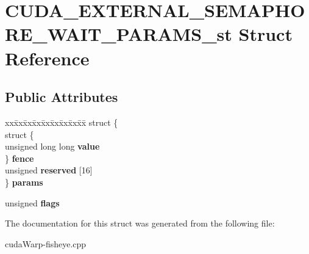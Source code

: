 \hypertarget{structCUDA__EXTERNAL__SEMAPHORE__WAIT__PARAMS__st}{}\section{C\+U\+D\+A\+\_\+\+E\+X\+T\+E\+R\+N\+A\+L\+\_\+\+S\+E\+M\+A\+P\+H\+O\+R\+E\+\_\+\+W\+A\+I\+T\+\_\+\+P\+A\+R\+A\+M\+S\+\_\+st Struct Reference}
\label{structCUDA__EXTERNAL__SEMAPHORE__WAIT__PARAMS__st}
\subsection*{Public Attributes}
\begin{DoxyCompactItemize}
\item 
\begin{tabbing}
xx\=xx\=xx\=xx\=xx\=xx\=xx\=xx\=xx\=\kill
struct \{\\
\>struct \{\\
\>\>unsigned long long {\bfseries value}\\
\>\} {\bfseries fence}\\
\>unsigned {\bfseries reserved} \mbox{[}16\mbox{]}\\
\} {\bfseries params}\hypertarget{structCUDA__EXTERNAL__SEMAPHORE__WAIT__PARAMS__st_abf6d63547737e7929ed2e1e17262b6fe}{}\label{structCUDA__EXTERNAL__SEMAPHORE__WAIT__PARAMS__st_abf6d63547737e7929ed2e1e17262b6fe}
\\

\end{tabbing}\item 
unsigned {\bfseries flags}\hypertarget{structCUDA__EXTERNAL__SEMAPHORE__WAIT__PARAMS__st_a1363c5de5aaa3738aaa923710fe83fa8}{}\label{structCUDA__EXTERNAL__SEMAPHORE__WAIT__PARAMS__st_a1363c5de5aaa3738aaa923710fe83fa8}

\end{DoxyCompactItemize}


The documentation for this struct was generated from the following file\+:\begin{DoxyCompactItemize}
\item 
cuda\+Warp-\/fisheye.\+cpp\end{DoxyCompactItemize}
